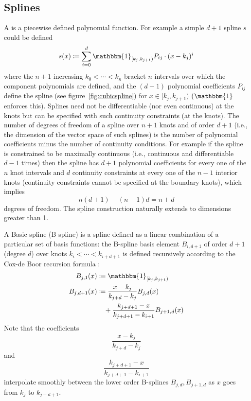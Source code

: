 \subsection{Splines}\label{subsubsec:splines}

A  is a piecewise defined polynomial function. For example a simple  \(d+1\) spline \(s\) could be defined
%
\[
    s(x) \coloneqq \sum_{i=0}^d \mathbbm{1}_{[k_j, k_{j+1})}P_{ij} \cdot (x - k_j)^i
\]
%
where the \(n+1\) increasing  \(k_0 < \cdots < k_n\) bracket \(n\) intervals over which the component polynomials are defined, and the \((d+1)\) polynomial coefficients \(P_{ij}\) define the spline (see figure~\ref{fig:cubicspline}) for \(x \in [k_j, k_{j+1})\) (\(\mathbbm{1}\) enforces this).
%
Splines need not be differentiable (nor even continuous) at the knots but can be specified with such continuity constraints (at the knots).
%
The number of degrees of freedom of a spline over \(n+1\) knots and of order \(d+1\) (i.e., the dimension of the vector space of such splines) is the number of polynomial coefficients minus the number of continuity conditions.
%
For example if the spline is constrained to be maximally continuous (i.e., continuous and differentiable \(d-1\) times) then the spline has \(d+1\) polynomial coefficients for every one of the \(n\) knot intervals and \(d\) continuity constraints at every one of the \(n-1\) interior knots (continuity constraints cannot be specified at the boundary knots), which implies
%
\[
    n(d+1) - (n-1)d = n+d
\]
%
degrees of freedom. The spline construction naturally extends to dimensions greater than 1.

A Basic-spline (B-spline) is a spline defined as a linear combination of a particular set of basis functions: the B-spline basis element \(B_{i, d+1}\) of order \(d+1\) (degree \(d\)) over knots \(k_i < \cdots < k_{i+d+1}\) is defined recursively according to the Cox-de Boor recursion formula \cite{de1971subroutine}:
%
\begin{align}
    B_{j,1} (x)   & \coloneqq \mathbbm{1}_{[k_j, k_{j+1})}                         \\
    B_{j,d+1} (x) & \coloneqq \frac{x-k_j}{k_{j+d} - k_j} B_{j,d} (x)              \\
                  & \quad+ \frac{k_{j+d+1} - x}{k_{j+d+1} - k_{i+1}} B_{j+1,d} (x)
\end{align}
%
Note that the coefficients
%
\[
    \frac{x-k_j}{k_{j+d} - k_j}
\]
%
and
%
\[
    \frac{k_{j+d+1} - x}{k_{j+d+1} - k_{i+1}}
\]
%
interpolate smoothly between the lower order B-splines \(B_{j,d}, B_{j+1,d}\) as \(x\) goes from \(k_j\) to \(k_{j+d+1}\).

